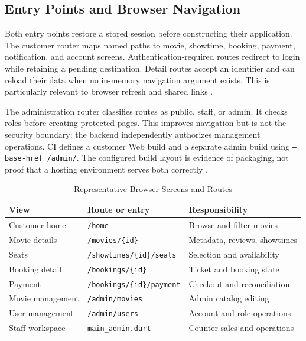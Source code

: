 \documentclass[conference]{IEEEtran}
\newcommand{\code}[1]{\texttt{#1}}
\begin{document}
\subsection{Entry Points and Browser Navigation}
Both entry points restore a stored session before constructing their application.
The customer router maps named paths to movie, showtime, booking, payment,
notification, and account screens. Authentication-required routes redirect to
login while retaining a pending destination. Detail routes accept an identifier
and can reload their data when no in-memory navigation argument exists.
This is particularly relevant to browser refresh and shared links
\cite{client}.

The administration router classifies routes as public, staff, or admin. It
checks roles before creating protected pages. This improves navigation but is
not the security boundary: the backend independently authorizes management
operations. CI defines a customer Web build and a separate admin build using
\code{--base-href /admin/}. The configured build layout is evidence of packaging,
not proof that a hosting environment serves both correctly \cite{client,tests}.

\begin{table}[t]
\caption{Representative Browser Screens and Routes}\label{tab:routes}
\centering\footnotesize
\begin{tabularx}{\columnwidth}{@{}lYY@{}}\toprule
View & Route or entry & Responsibility\\\midrule
Customer home & \code{/home} & Browse and filter movies\\
Movie details & \code{/movies/\{id\}} & Metadata, reviews, showtimes\\
Seats & \code{/showtimes/}\allowbreak\code{\{id\}/seats} & Selection and availability\\
Booking detail & \code{/bookings/\{id\}} & Ticket and booking state\\
Payment & \code{/bookings/}\allowbreak\code{\{id\}/payment} & Checkout and reconciliation\\
Movie management & \code{/admin/movies} & Admin catalog editing\\
User management & \code{/admin/users} & Account and role operations\\
Staff workspace & \code{main\_admin.dart} & Counter sales and operations\\\bottomrule
\end{tabularx}
\end{table}
\end{document}
